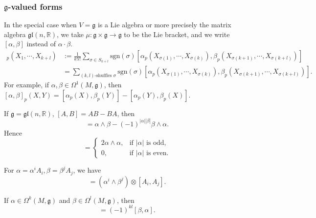 \subsubsection*{$\mathfrak{g}$-valued forms}
In the special case when $V=\mathfrak{g}$ is a Lie algebra or more precisely the matrix algebra $\mathfrak{gl}(n,\mathbb{R})$, 
we take $\mu:\mathfrak{g}\times \mathfrak{g}\to \mathfrak{g}$ to be the Lie bracket, and we write $[\alpha,\beta]$ instead of $\alpha\cdot \beta$. 
\begin{align*}
    [\alpha,\beta]_p(X_1,\cdots,X_{k+l}) &:= \frac{1}{k!l!}\sum_{\sigma\in S_{k+l}} \mathrm{sgn}(\sigma)[\alpha_p(X_{\sigma(1)},\cdots,X_{\sigma(k)}),\beta_p(X_{\sigma(k+1)},\cdots,X_{\sigma(k+l)})] \\
    &= \sum_{(k,l)\text{-shuffles }\sigma} \mathrm{sgn}(\sigma)[\alpha_p(X_{\sigma(1)},\cdots,X_{\sigma(k)}),\beta_p(X_{\sigma(k+1)},\cdots,X_{\sigma(k+l)})].
\end{align*}
For example, if $\alpha,\beta\in \Omega^1(M,\mathfrak{g})$, then $[\alpha,\beta]_p(X,Y) = [\alpha_p(X),\beta_p(Y)] - [\alpha_p(Y),\beta_p(X)]$.
\begin{example}
    If $\mathfrak{g}=\mathfrak{gl}(n,\mathbb{R})$, $[A,B] = AB - BA$, then 
    \begin{equation*}
        [\alpha,\beta] = \alpha\wedge \beta - (-1)^{|\alpha||\beta|}\beta\wedge \alpha.
    \end{equation*} 
    Hence 
    \begin{equation*}
        [\alpha,\alpha] = 
        \begin{cases}
            2\alpha\wedge \alpha, & \text{if }|\alpha|\text{ is odd}, \\
            0, & \text{if }|\alpha|\text{ is even}.
        \end{cases}
    \end{equation*}
\end{example}
\begin{proposition}
    For $\alpha=\alpha^iA_i,\beta=\beta^jA_j$, we have
    \begin{equation*}
        [\alpha,\beta] = (\alpha^i\wedge \beta^j)\otimes [A_i,A_j].
    \end{equation*}
\end{proposition}
\begin{corollary}
    If $\alpha\in \Omega^k(M,\mathfrak{g})$ and $\beta\in \Omega^l(M,\mathfrak{g})$, then
    \begin{equation*}
        [\alpha,\beta] = (-1)^{kl}[\beta,\alpha].
    \end{equation*}
\end{corollary}

